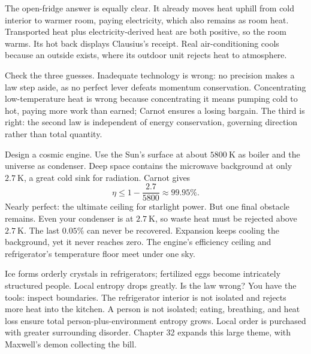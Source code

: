 The open-fridge answer is equally clear. It already moves heat uphill from cold interior to warmer room, paying electricity, which also remains as room heat. Transported heat plus electricity-derived heat are both positive, so the room warms. Its hot back displays Clausius's receipt. Real air-conditioning cools because an outside exists, where its outdoor unit rejects heat to atmosphere.

Check the three guesses. Inadequate technology is wrong: no precision makes a law step aside, as no perfect lever defeats momentum conservation. Concentrating low-temperature heat is wrong because concentrating it means pumping cold to hot, paying more work than earned; Carnot ensures a losing bargain. The third is right: the second law is independent of energy conservation, governing direction rather than total quantity.


\begin{thought}
Design a cosmic engine. Use the Sun's surface at about \(5800\ \mathrm{K}\) as boiler and the universe as condenser. Deep space contains the microwave background at only \(2.7\ \mathrm{K}\), a great cold sink for radiation. Carnot gives
\[
\eta\leq 1-\frac{2.7}{5800}\approx 99.95\%.
\]
Nearly perfect: the ultimate ceiling for starlight power. But one final obstacle remains. Even your condenser is at \(2.7\ \mathrm{K}\), so waste heat must be rejected above \(2.7\ \mathrm{K}\). The last \(0.05\%\) can never be recovered. Expansion keeps cooling the background, yet it never reaches zero. The engine's efficiency ceiling and refrigerator's temperature floor meet under one sky.
\end{thought}

\begin{thought}
Ice forms orderly crystals in refrigerators; fertilized eggs become intricately structured people. Local entropy drops greatly. Is the law wrong? You have the tools: inspect boundaries. The refrigerator interior is not isolated and rejects more heat into the kitchen. A person is not isolated; eating, breathing, and heat loss ensure total person-plus-environment entropy grows. Local order is purchased with greater surrounding disorder. Chapter 32 expands this large theme, with Maxwell's demon collecting the bill.
\end{thought}

